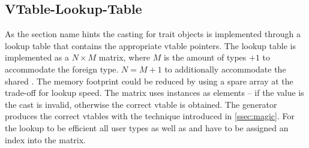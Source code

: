 \documentclass[thesis]{subfiles}
\begin{document}
  \subsection{VTable-Lookup-Table}
    As the section name hints the casting for trait objects is implemented through a lookup table that contains the appropriate vtable pointers.
    The lookup table is implemented as a $N \times M$ matrix, where $M$ is the amount of types $+1$ to accommodate the foreign type.
    $N=M+1$ to additionally accommodate the shared \trait \SkillObject.
    The memory footprint could be reduced by using a spare array at the trade-off for lookup speed.
    The matrix uses  instances as elements -- if the value is  the cast is invalid, otherwise the correct vtable is obtained.
    The generator produces the correct vtables with the technique introduced in \autoref{ssec:magic}.
    For the lookup to be efficient all user types as well as  and \SkillObject have to be assigned an index into the matrix.
\end{document}
